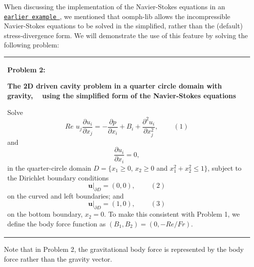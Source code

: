 When discussing the implementation of the Navier-\/\+Stokes equations in an \href{../../driven_cavity/html/index.html#stress_divergence}{\tt earlier example }, we mentioned that {\ttfamily oomph-\/lib} allows the incompressible Navier-\/\+Stokes equations to be solved in the simplified, rather than the (default) stress-\/divergence form. We will demonstrate the use of this feature by solving the following problem\+: \begin{center} \tabulinesep=1mm
\begin{longtabu} spread 0pt [c]{*{1}{|X[-1]}|}
\hline


\begin{center} {\bfseries Problem 2\+:}\end{center} 

\begin{center}{\bfseries The 2D driven cavity problem in a quarter circle domain with gravity, ~\newline
 using the simplified form of the Navier-\/\+Stokes equations}\end{center} 

\begin{center}\end{center}  Solve \[ Re\phantom{i}u_j\frac{\partial u_i}{\partial x_j} = - \frac{\partial p}{\partial x_i} + B_i + \frac{\partial^2 u_i}{\partial x_j^2}, \ \ \ \ \ \ \ \ \ \ (1) \] and \[ \frac{\partial u_i}{\partial x_i} = 0, \] in the quarter-\/circle domain $ D = \{x_1 \geq 0 $, $ x_2 \geq 0 $ and $ x_1^2+x_2^2 \leq 1 \} $, subject to the Dirichlet boundary conditions \[ \left. \mathbf{u}\right|_{\partial D}=(0,0), \ \ \ \ \ \ \ \ \ \ (2) \] on the curved and left boundaries; and \[ \left. \mathbf{u}\right|_{\partial D}=(1,0), \ \ \ \ \ \ \ \ \ \ (3) \] on the bottom boundary, $ x_2 = 0 $. To make this consistent with Problem 1, we define the body force function as $ (B_1, B_2) = (0,-Re/Fr) $.   \\
\end{longtabu}
\end{center} 

Note that in Problem 2, the gravitational body force is represented by the body force rather than the gravity vector.



